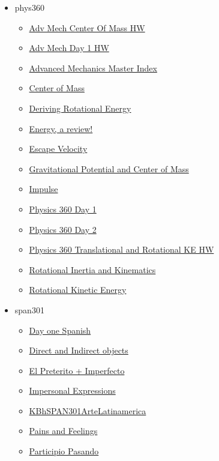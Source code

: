 \documentclass[11pt]{article}
\begin{document}
\begin{itemize}
\item phys360
\begin{itemize}
\item \href{phys360/KBdPHYS360CenterOfMassHW.org}{Adv Mech Center Of Mass HW}
\item \href{phys360/KBdPHYS360Day1HW.org}{Adv Mech Day 1 HW}
\item \href{phys360/KBPHYS360MasterIndex.org}{Advanced Mechanics Master Index}
\item \href{phys360/KBhPHYS360CenterOfMass.org}{Center of Mass}
\item \href{phys360/KBhPHYS360RotationalKineticEnergyDerivation.org}{Deriving Rotational Energy}
\item \href{phys360/KBhPHYS360Energy.org}{Energy, a review!}
\item \href{phys360/KBhPHYS360EscapeVelocity.org}{Escape Velocity}
\item \href{phys360/KBhPHYS360GravitationMass.org}{Gravitational Potential and Center of Mass}
\item \href{phys360/KBhPHYS360Impulse.org}{Impulse}
\item \href{phys360/KBhPHYS360Day1.org}{Physics 360 Day 1}
\item \href{phys360/KBdPHYS360Day2.org}{Physics 360 Day 2}
\item \href{phys360/KBdPHYS360TranslationalRotationalKE.org}{Physics 360 Translational and Rotational KE HW}
\item \href{phys360/KBhPHYS360InertiaAndKinematics.org}{Rotational Inertia and Kinematics}
\item \href{phys360/KBhPHYS360RotationalKineticEnergy.org}{Rotational Kinetic Energy}
\end{itemize}
\item span301
\begin{itemize}
\item \href{span301/KB20200824175405.org}{Day one Spanish}
\item \href{span301/KBhSPAN201DirectIndirectObject.org}{Direct and Indirect objects}
\item \href{span301/KBhSPAN301Preterito.org}{El Preterito + Imperfecto}
\item \href{span301/KBhSPAN301ImpersonalExpressions.org}{Impersonal Expressions}
\item \href{span301/KBhSPAN301ArteLatinamerica.org}{KBhSPAN301ArteLatinamerica}
\item \href{span301/KBhSPAN301PainsAndFeeling.org}{Pains and Feelings}
\item \href{span301/KBhSPAN301ParticipioPasando.org}{Participio Pasando}

\end{itemize}
\end{itemize}
\end{document}
